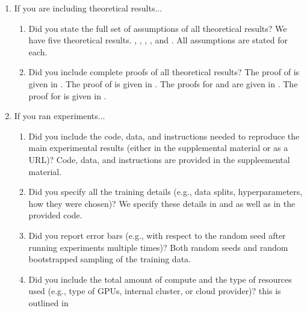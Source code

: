 \documentclass{article}
\begin{document}
\begin{enumerate}
\item If you are including theoretical results...
\begin{enumerate}
    \item Did you state the full set of assumptions of all theoretical results?
        \answerYes{} 
        We have five theoretical results. 
        , , , , and .
        All assumptions are stated for each.
    \item Did you include complete proofs of all theoretical results?
        \answerYes{}
        The proof of  is given in . 
        The proof of  is given in .
        The proofs for  and  are given in .
        The proof for  is given in .
\end{enumerate}


\item If you ran experiments...
\begin{enumerate}
  \item Did you include the code, data, and instructions needed to reproduce the main experimental results (either in the supplemental material or as a URL)?
    \answerYes{} Code, data, and instructions are provided in the suppleemental material. 
  \item Did you specify all the training details (e.g., data splits, hyperparameters, how they were chosen)?
    \answerYes{} We specify these details in  and  as well as in the provided code. 
    \item Did you report error bars (e.g., with respect to the random seed after running experiments multiple times)?
    \answerYes{} Both random seeds and random bootstrapped sampling of the training data.
    \item Did you include the total amount of compute and the type of resources used (e.g., type of GPUs, internal cluster, or cloud provider)?
    \answerYes{} this is outlined in 
\end{enumerate}



\end{enumerate}
\end{document}
